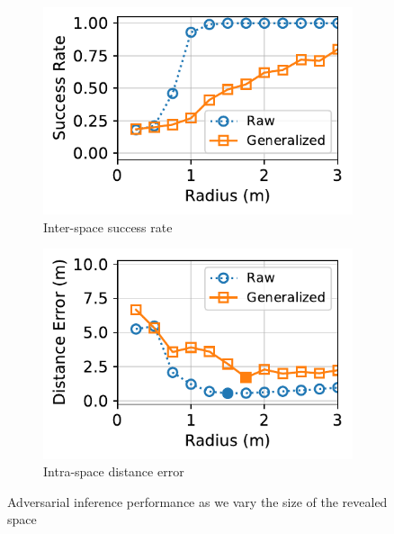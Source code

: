 \begin{figure}[t]
	\centering
	\begin{subfigure}{0.48\columnwidth}
		\includegraphics[width=\columnwidth]{figures/cdng-partial-interspace.pdf}
		\vspace{-5mm}
		\caption{\small Inter-space success rate}
		\label{fig:partial-interspace}
	\end{subfigure}
	\begin{subfigure}{0.48\columnwidth}
		\includegraphics[width=\columnwidth]{figures/cdng-partial-intraspace.pdf}
		\vspace{-5mm}
        \caption{\small Intra-space distance error}
		\label{fig:partial-intraspace}
	\end{subfigure}
	\vspace{-3mm}
    \caption{\small Adversarial inference performance as we vary the size of the revealed space}
	\label{fig:partial-performance}
	\vspace{-3mm}
\end{figure}

